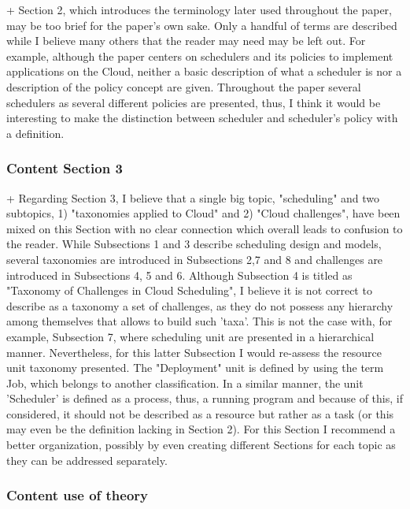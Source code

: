 + Section 2, which introduces the terminology later used throughout
the paper, may be too brief for the paper's own sake. Only a handful
of terms are described while I believe many others that the reader may
need may be left out. For example, although the paper centers on
schedulers and its policies to implement applications on the Cloud,
neither a basic description of what a scheduler is nor a description
of the policy concept are given. Throughout the paper several
schedulers as several different policies are presented, thus, I think
it would be interesting to make the distinction between scheduler and
scheduler's policy with a definition.




\subsubsection{Content Section 3}

+ Regarding Section 3, I believe that a single big topic, "scheduling"
and two subtopics, 1) "taxonomies applied to Cloud" and 2) "Cloud
challenges", have been mixed on this Section with no clear connection
which overall leads to confusion to the reader. While Subsections 1
and 3 describe scheduling design and models, several taxonomies are
introduced in Subsections 2,7 and 8 and challenges are introduced in
Subsections 4, 5 and 6. Although Subsection 4 is titled as "Taxonomy
of Challenges in Cloud Scheduling", I believe it is not correct to
describe as a taxonomy a set of challenges, as they do not possess any
hierarchy among themselves that allows to build such 'taxa'. This is
not the case with, for example, Subsection 7, where scheduling unit
are presented in a hierarchical manner. Nevertheless, for this latter
Subsection I would re-assess the resource unit taxonomy presented. The
"Deployment" unit is defined by using the term Job, which belongs to
another classification. In a similar manner, the unit 'Scheduler' is
defined as a process, thus, a running program and because of this, if
considered, it should not be described as a resource but rather as a
task (or this may even be the definition lacking in Section 2). For
this Section I recommend a better organization, possibly by even
creating different Sections for each topic as they can be addressed
separately.



\subsubsection{Content use of theory}


